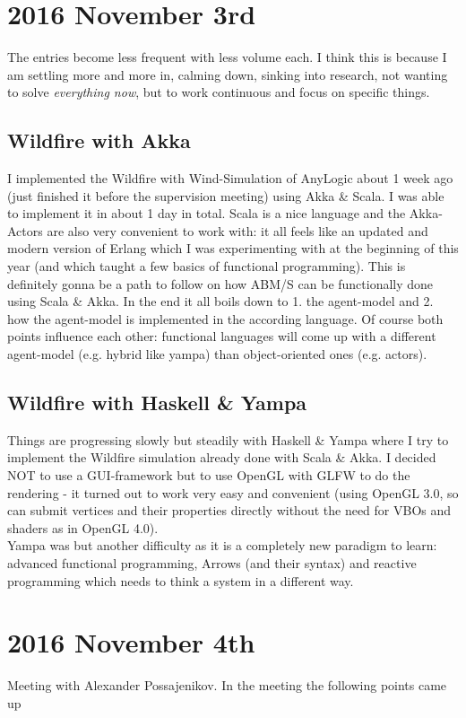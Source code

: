 \section*{2016 November 3rd}
The entries become less frequent with less volume each. I think this is because I am settling more and more in, calming down, sinking into research, not wanting to solve \textit{everything now}, but to work continuous and focus on specific things.

\subsection*{Wildfire with Akka}
I implemented the Wildfire with Wind-Simulation of AnyLogic about 1 week ago (just finished it before the supervision meeting) using Akka \& Scala. I was able to implement it in about 1 day in total. Scala is a nice language and the Akka-Actors are also very convenient to work with: it all feels like an updated and modern version of Erlang which I was experimenting with at the beginning of this year (and which taught a few basics of functional programming). This is definitely gonna be a path to follow on how ABM/S can be functionally done using Scala \& Akka. In the end it all boils down to 1. the agent-model and 2. how the agent-model is implemented in the according language. Of course both points influence each other: functional languages will come up with a different agent-model (e.g. hybrid like yampa) than object-oriented ones (e.g. actors).

\subsection*{Wildfire with Haskell \& Yampa}
Things are progressing slowly but steadily with Haskell \& Yampa where I try to implement the Wildfire simulation already done with Scala \& Akka. I decided NOT to use a GUI-framework but to use OpenGL with GLFW to do the rendering - it turned out to work very easy and convenient (using OpenGL 3.0, so can submit vertices and their properties directly without the need for VBOs and shaders as in OpenGL 4.0). \\
Yampa was but another difficulty as it is a completely new paradigm to learn: advanced functional programming, Arrows (and their syntax) and reactive programming which needs to think a system in a different way.

\section*{2016 November 4th}
Meeting with Alexander Possajenikov. In the meeting the following points came up

